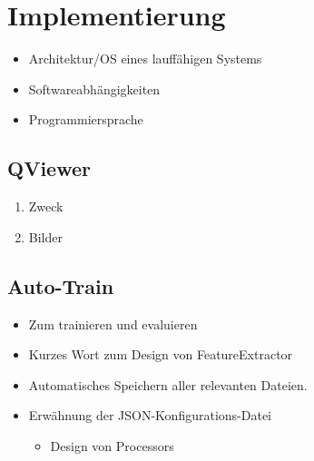 \chapter{Implementierung}\label{ch:implementierung}
\begin{itemize}
  \item Architektur/OS eines lauffähigen Systems
  \item Softwareabhängigkeiten 
  \item Programmiersprache
\end{itemize}

\section{QViewer}
\begin{enumerate}
  \item Zweck
  \item Bilder
\end{enumerate}

\section{Auto-Train}
\begin{itemize}
  \item Zum trainieren und evaluieren
  \item Kurzes Wort zum Design von FeatureExtractor
  \item Automatisches Speichern aller relevanten Dateien.
  \item Erwähnung der JSON-Konfigurations-Datei
    \begin{itemize}
    \item Design von Processors
  \end{itemize}
\end{itemize}
